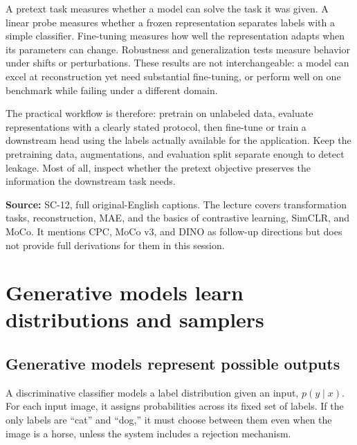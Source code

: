\hypertarget{04-visual-computing-ii-ch031-choose-the-evaluation-to-match-the-claim}{}

A pretext task measures whether a model can solve the task it was given. A linear probe measures whether a frozen representation separates labels with a simple classifier. Fine-tuning measures how well the representation adapts when its parameters can change. Robustness and generalization tests measure behavior under shifts or perturbations. These results are not interchangeable: a model can excel at reconstruction yet need substantial fine-tuning, or perform well on one benchmark while failing under a different domain.

The practical workflow is therefore: pretrain on unlabeled data, evaluate representations with a clearly stated protocol, then fine-tune or train a downstream head using the labels actually available for the application. Keep the pretraining data, augmentations, and evaluation split separate enough to detect leakage. Most of all, inspect whether the pretext objective preserves the information the downstream task needs.

\textbf{Source:} SC-12, full original-English captions. The lecture covers transformation tasks, reconstruction, MAE, and the basics of contrastive learning, SimCLR, and MoCo. It mentions CPC, MoCo v3, and DINO as follow-up directions but does not provide full derivations for them in this session.

\section{Generative models learn distributions and samplers}\label{04-visual-computing-ii-ch031-generative-models-learn-distributions-and-samplers}

\hypertarget{04-visual-computing-ii-ch031-generative-models-learn-distributions-and-samplers}{}

\subsection{Generative models represent possible outputs}\label{04-visual-computing-ii-ch031-generative-models-represent-possible-outputs}

\hypertarget{04-visual-computing-ii-ch031-generative-models-represent-possible-outputs}{}

A discriminative classifier models a label distribution given an input, \(p(y\mid x)\). For each input image, it assigns probabilities across its fixed set of labels. If the only labels are ``cat'' and ``dog,'' it must choose between them even when the image is a horse, unless the system includes a rejection mechanism.

